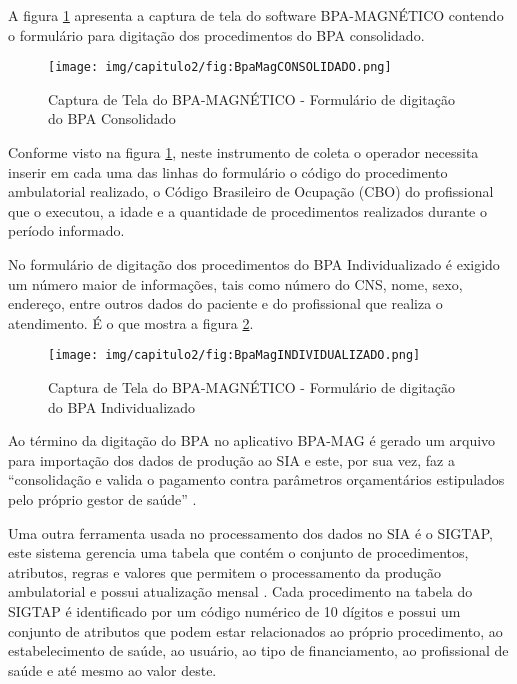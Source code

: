A figura \ref{fig:BpaMagCONSOLIDADO} apresenta a captura de tela do software BPA-MAGNÉTICO contendo o formulário para digitação dos procedimentos do BPA consolidado.

\begin{figure}[H]
    \centering
     \caption{Captura de Tela do BPA-MAGNÉTICO - Formulário de digitação do BPA Consolidado}
    \texttt{[image: img/capitulo2/fig:BpaMagCONSOLIDADO.png]}
    \label{fig:BpaMagCONSOLIDADO}
\end{figure}

Conforme visto na figura \ref{fig:BpaMagCONSOLIDADO}, neste instrumento de coleta o operador necessita inserir em cada uma das linhas do formulário o código do procedimento ambulatorial realizado, o Código Brasileiro de Ocupação (CBO) do profissional que o executou, a idade e a quantidade de procedimentos realizados durante o período informado. 

No formulário de digitação dos procedimentos do BPA Individualizado é exigido um número maior de informações, tais como número do CNS, nome, sexo, endereço, entre outros dados do paciente e do profissional que realiza o atendimento. É o que mostra a figura \ref{fig:BpaMagINDIVIDUALIZADO}.   
\begin{figure}[H]
    \centering
     \caption{Captura de Tela do BPA-MAGNÉTICO - Formulário de digitação do BPA Individualizado}
    \texttt{[image: img/capitulo2/fig:BpaMagINDIVIDUALIZADO.png]}
    \label{fig:BpaMagINDIVIDUALIZADO}
\end{figure}

Ao término da digitação do BPA no aplicativo BPA-MAG é gerado um arquivo para importação dos dados de produção ao SIA e este, por sua vez, faz a ``consolidação e valida o pagamento contra parâmetros orçamentários estipulados pelo próprio gestor de saúde'' \cite[p. 01]{datasus}.

Uma outra ferramenta usada no processamento dos dados no SIA é o SIGTAP, este sistema gerencia uma tabela que contém o conjunto de procedimentos, atributos, regras e valores que permitem o processamento da produção ambulatorial e possui atualização mensal \cite{manualsiasus}. Cada procedimento na tabela do SIGTAP é identificado por um código numérico de 10 dígitos e possui um conjunto de atributos que podem estar relacionados ao próprio procedimento, ao estabelecimento de saúde, ao usuário, ao tipo de financiamento, ao profissional de saúde e até mesmo ao valor deste.


